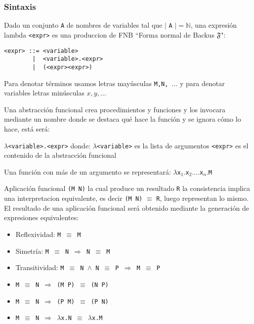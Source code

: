 \subsubsection{Sintaxis}

Dado un conjunto \texttt{A} de nombres de variables tal que $\vert$ 
\texttt{A} $\vert = \mathbb{N}$, una expresión lambda \texttt{<expr>} es una produccion de FNB ``Forma normal de Backus $\mathfrak{F}$":

\begin{verbatim}
<expr> ::= <variable> 
        |  <variable>.<expr> 
        |  (<expr><expr>)
\end{verbatim}

\begin{note}
Para denotar términos usamos letras mayúsculas \texttt{M,N, $\dots$} y para denotar variables letras  minúsculas \texttt{$x,y, \dots$}
\end{note}

Una abstracción funcional crea procedimientos y funciones y los invocara mediante un nombre donde se destaca qué hace la función y se ignora cómo lo hace, está será:

\texttt{$\lambda$<variable>.<expr>}
donde:
\texttt{$\lambda$<variable>} es la lista de argumentos
\texttt{<expr>} es el contenido de la abstracción funcional

Una función con más de un argumento se representará:
\texttt{$\lambda $x$_1. $x$_2. \dots $x$_n. $M}

\begin{defn}\end{defn}

Aplicación funcional  \texttt{(M N)} la cual produce un resultado \texttt{R} la consistencia implica una interpretacion equivalente,
es decir \texttt{(M N)} $\equiv$ \texttt{R}, luego representan lo mismo.
El resultado de una aplicación funcional será obtenido mediante la generación de expresiones equivalentes:

\begin{defn}
\end{defn}
\begin{itemize}
\item Reflexividad: \texttt{M $\equiv$ M}
\item Simetría: \texttt{M $\equiv$ N $\Rightarrow$ N $\equiv$ M}
\item Transitividad: \texttt{M $\equiv$ N $\wedge$ N $\equiv$ P $\Rightarrow$  M $\equiv$ P}
\item \texttt{M $\equiv$ N $\Rightarrow$ (M P) $\equiv$ (N P)}
\item \texttt{M $\equiv$ N $\Rightarrow$ (P M) $\equiv$ (P N)}
\item \texttt{M $\equiv$ N $\Rightarrow$ $\lambda$x.N $\equiv$ $\lambda$x.M}
\end{itemize}

